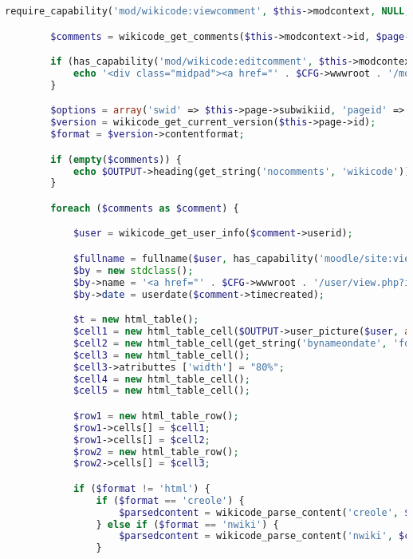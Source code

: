 \begin{lstlisting}[language=PHP]
        require_capability('mod/wikicode:viewcomment', $this->modcontext, NULL, true, 'noviewcommentpermission', 'wikicode');

        $comments = wikicode_get_comments($this->modcontext->id, $page->id);

        if (has_capability('mod/wikicode:editcomment', $this->modcontext)) {
            echo '<div class="midpad"><a href="' . $CFG->wwwroot . '/mod/wikicode/editcomments.php?action=add&amp;pageid=' . $page->id . '">' . get_string('addcomment', 'wikicode') . '</a></div>';
        }

        $options = array('swid' => $this->page->subwikiid, 'pageid' => $page->id);
        $version = wikicode_get_current_version($this->page->id);
        $format = $version->contentformat;

        if (empty($comments)) {
            echo $OUTPUT->heading(get_string('nocomments', 'wikicode'));
        }

        foreach ($comments as $comment) {

            $user = wikicode_get_user_info($comment->userid);

            $fullname = fullname($user, has_capability('moodle/site:viewfullnames', get_context_instance(CONTEXT_COURSE, $course->id)));
            $by = new stdclass();
            $by->name = '<a href="' . $CFG->wwwroot . '/user/view.php?id=' . $user->id . '&amp;course=' . $course->id . '">' . $fullname . '</a>';
            $by->date = userdate($comment->timecreated);

            $t = new html_table();
            $cell1 = new html_table_cell($OUTPUT->user_picture($user, array('popup' => true)));
            $cell2 = new html_table_cell(get_string('bynameondate', 'forum', $by));
            $cell3 = new html_table_cell();
            $cell3->atributtes ['width'] = "80%";
            $cell4 = new html_table_cell();
            $cell5 = new html_table_cell();

            $row1 = new html_table_row();
            $row1->cells[] = $cell1;
            $row1->cells[] = $cell2;
            $row2 = new html_table_row();
            $row2->cells[] = $cell3;

            if ($format != 'html') {
                if ($format == 'creole') {
                    $parsedcontent = wikicode_parse_content('creole', $comment->content, $options);
                } else if ($format == 'nwiki') {
                    $parsedcontent = wikicode_parse_content('nwiki', $comment->content, $options);
                }


\end{lstlisting}
